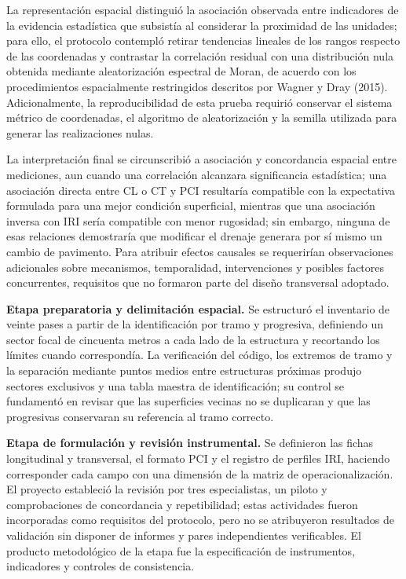 La representación espacial distinguió la asociación observada entre indicadores de la evidencia estadística que subsistía al considerar la proximidad de las unidades; para ello, el protocolo contempló retirar tendencias lineales de los rangos respecto de las coordenadas y contrastar la correlación residual con una distribución nula obtenida mediante aleatorización espectral de Moran, de acuerdo con los procedimientos espacialmente restringidos descritos por Wagner y Dray (2015). Adicionalmente, la reproducibilidad de esta prueba requirió conservar el sistema métrico de coordenadas, el algoritmo de aleatorización y la semilla utilizada para generar las realizaciones nulas.

La interpretación final se circunscribió a asociación y concordancia espacial entre mediciones, aun cuando una correlación alcanzara significancia estadística; una asociación directa entre CL o CT y PCI resultaría compatible con la expectativa formulada para una mejor condición superficial, mientras que una asociación inversa con IRI sería compatible con menor rugosidad; sin embargo, ninguna de esas relaciones demostraría que modificar el drenaje generara por sí mismo un cambio de pavimento. Para atribuir efectos causales se requerirían observaciones adicionales sobre mecanismos, temporalidad, intervenciones y posibles factores concurrentes, requisitos que no formaron parte del diseño transversal adoptado.


\textbf{Etapa preparatoria y delimitación espacial.} Se estructuró el inventario de veinte pases a partir de la identificación por tramo y progresiva, definiendo un sector focal de cincuenta metros a cada lado de la estructura y recortando los límites cuando correspondía. La verificación del código, los extremos de tramo y la separación mediante puntos medios entre estructuras próximas produjo sectores exclusivos y una tabla maestra de identificación; su control se fundamentó en revisar que las superficies vecinas no se duplicaran y que las progresivas conservaran su referencia al tramo correcto.

\textbf{Etapa de formulación y revisión instrumental.} Se definieron las fichas longitudinal y transversal, el formato PCI y el registro de perfiles IRI, haciendo corresponder cada campo con una dimensión de la matriz de operacionalización. El proyecto estableció la revisión por tres especialistas, un piloto y comprobaciones de concordancia y repetibilidad; estas actividades fueron incorporadas como requisitos del protocolo, pero no se atribuyeron resultados de validación sin disponer de informes y pares independientes verificables. El producto metodológico de la etapa fue la especificación de instrumentos, indicadores y controles de consistencia.

